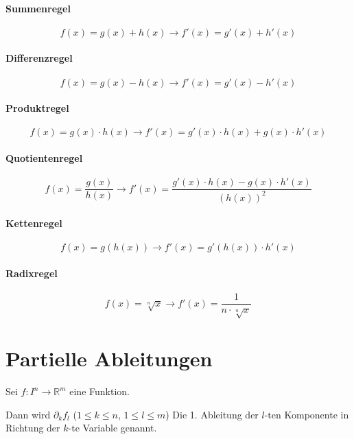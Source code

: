             \paragraph{Summenregel}
                \[ f(x) = g(x) + h(x) \rightarrow f'(x) = g'(x) + h'(x) \]

            \paragraph{Differenzregel}
                \[ f(x) = g(x) - h(x) \rightarrow f'(x) = g'(x) - h'(x) \]

            \paragraph{Produktregel}
                \[ f(x) = g(x) \cdot h(x) \rightarrow f'(x) = g'(x) \cdot h(x) + g(x) \cdot h'(x) \]

            \paragraph{Quotientenregel}
                \[ f(x) = \frac{g(x)}{h(x)} \rightarrow f'(x) = \frac{g'(x) \cdot h(x) - g(x) \cdot h'(x)}{(h(x)) ^ 2} \]

            \paragraph{Kettenregel}
                \[ f(x) = g(h(x)) \rightarrow f'(x) = g'(h(x)) \cdot h'(x) \]

            \paragraph{Radixregel}
            \[ f(x) = \sqrt[n]{x} \rightarrow f'(x) = \frac{1}{n \cdot \sqrt[n]{x}} \]

    \section{Partielle Ableitungen}
        Sei $ f : I ^ n \rightarrow \mathbb{R} ^ m $ eine Funktion.

        Dann wird $ \partial _ k f _ l $ ($ 1 \leq k \leq n $, $ 1 \leq l \leq m $) Die 1. Ableitung der $ l\text{-ten} $ Komponente in Richtung der $ k\text{-te} $ Variable genannt.


